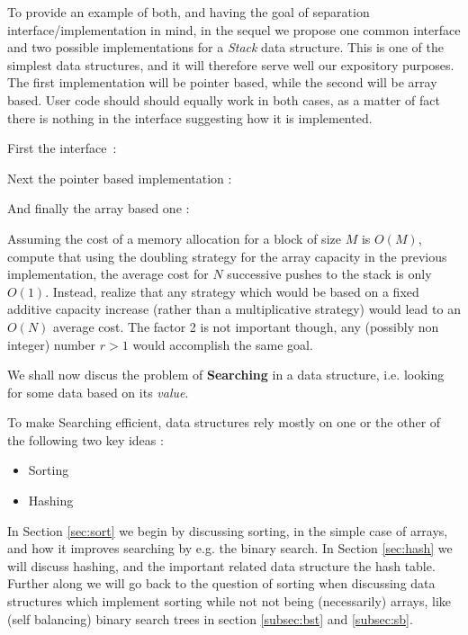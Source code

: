 \documentclass[12pt]{article}
\theoremstyle{plain}
\theoremstyle{remark}
\begin{document}
To provide an example of both, and having the goal of separation 
interface/implementation in mind, in the sequel we propose one common 
interface and two possible implementations for a {\it Stack} data structure.
This is one of the simplest data structures, and it will therefore serve well
our expository purposes. The first implementation will be pointer based, while 
the second will be array based. 
User code should should equally work in both cases, as a matter of fact there
is nothing in the interface suggesting how it is implemented.

\medskip
\noindent
First the interface~:


\noindent
Next the pointer based implementation :


\noindent
And finally the array based one :


 Assuming the cost of a memory allocation for a block
of size $M$ is $O(M)$, compute that using the doubling strategy for the array
capacity in the previous implementation, the average cost for $N$ successive
pushes to the stack is only $O(1)$. Instead, realize that any strategy which
would be based on a fixed additive capacity increase (rather than a 
multiplicative strategy) would lead to an $O(N)$ average cost. The factor 2 is
not important though, any (possibly non integer) number $r>1$ would accomplish
the same goal.  

\pagebreak

We shall now discus the problem of {\bf Searching} in a data 
structure, i.e. looking for some data based on its {\it value}. 

\medskip

To make Searching efficient, data structures rely mostly on one or the other
of the following two key ideas :

\begin{itemize}
	\item Sorting
	\item Hashing
\end{itemize}

In Section \ref{sec:sort} we begin by discussing sorting, in the simple case 
of arrays, and how it improves searching by e.g. the binary search. 
In Section \ref{sec:hash} we will discuss hashing, and
the important related data structure the hash table. Further along we will go 
back to the question of sorting when discussing data structures which implement 
sorting while not not being (necessarily) arrays, like (self balancing) 
binary search trees in section \ref{subsec:bst} and \ref{subsec:sb}.
\end{document}
